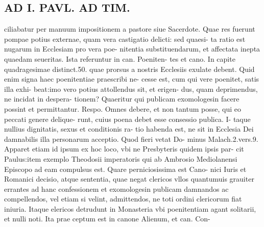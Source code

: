 \documentclass{article}
\begin{document}
\begin{pages}
\section*{AD I. PAVL. AD TIM. }
\marginpar{[ p.344 ]}\pstart ciliabatur per manuum impositionem a pastore siue Sacerdote. Quae res fuerunt pompae potius externae, quam vera castigatio delicti: sed quaesi- ta ratio est nugarum in Ecclesiam pro vera poe- nitentia substituendarum, et affectata inepta quaedam seueritas. Ista referuntur in can. Poeniten- tes et cano. In capite quadragesimae distinct.50. quae prorsus a nostris Ecclesiis exulate debent. Quid enim signa haec poenitentiae praescribi ne- cesse est, cum qui vere poenitet, satis illa exhi- beat:imo vero potius attollendus sit, et erigen- dus, quam deprimendus, ne incidat in despera- tionem? Quaeritur qui publicam exomologesin facere possint et permittantur. Respo. Omnes debere, et non tantum posse, qui eo peccati genere delique- runt, cuius poena debet esse consessio publica. I- taque nullius dignitatis, sexus et conditionis ra- tio habenda est, ne sit in Ecclesia Dei damnabilis illa personarum acceptio. Quod fieri vetat Do- minus Malach.2.vers.9. Apparet etiam id ipsum ex hoc loco, vbi ne Presbyteris quidem ipsis par- cit Paulus:item exemplo Theodosii imperatoris qui ab Ambrosio Mediolanensi Episcopo ad eam compulsus est. Quare perniciosissima est Cano- nici Iuris et Romanici decisio, atque sententia, quae negat clericos vllos quantumuis grauiter errantes ad hanc confessionem et exomologesin publicam damnandos ac compellendos, vel etiam si velint, admittendos, ne toti ordini clericorum fiat iniuria. Itaque elericos detrudunt in Monasteria vbi poenitentiam agant solitarii, et nulli noti. Ita prae ceptum est in canone Alienum, et can. Con-  \pend

\end{pages}
\end{document}
